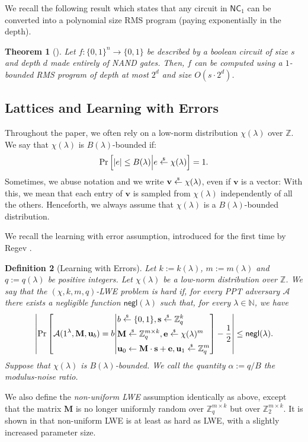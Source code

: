 \documentclass{article}
\newtheorem{theorem}{Theorem}\newtheorem{lemma}[theorem]{Lemma}\newtheorem{proposition}[theorem]{Proposition}\newtheorem{corollary}[theorem]{Corollary}\newtheorem{definition}[theorem]{Definition}\newtheorem{claim}[theorem]{Claim}
\newcommand{\getsr}{\overset{\raisebox{-1pt}{$\scriptscriptstyle \$$}}{\gets}}
\newcommand{\sample}{\getsr}
\newcommand{\N}{\mathbb{N}}
\newcommand{\Z}{\mathbb{Z}}
\newcommand{\negl}{\mathsf{negl}}
\renewcommand{\sec}{\ensuremath{\lambda}}
\newcommand{\Adv}{\mathcal{A}}
\newcommand\bbbone{1}
\begin{document}
We recall the following result which states that any circuit in $\mathsf{NC}_1$ can be converted into a polynomial size RMS program (paying exponentially in the depth).

\begin{theorem}[\cite{barrington,C:BoyGilIsh16}]
Let $f:\{0, 1\}^n\rightarrow \{0, 1\}$ be described by a boolean circuit of size $s$ and depth $d$ made entirely of NAND gates. Then, $f$ can be computed using a $1$-bounded RMS program of depth at most $2^d$ and size $O(s\cdot 2^d)$.
\end{theorem}

\subsection{Lattices and Learning with Errors}
Throughout the paper, we often rely on a low-norm distribution $\chi(\sec)$ over $\Z$. We say that $\chi(\sec)$ is $B(\sec)$-bounded if: \[\Pr\left[\lvert e\rvert\le B(\sec)\middle| e\sample\chi(\sec)\right]=1.\] Sometimes, we abuse notation and we write $\mathbf{v}\sample\chi(\sec)$, even if $\mathbf{v}$ is a vector: With this, we mean that each entry of $\mathbf{v}$ is sampled from $\chi(\sec)$ independently of all the others. {Henceforth, we always assume that $\chi(\lambda)$ is a $B(\sec)$-bounded distribution.}

We recall the learning with error assumption, introduced for the first time by Regev \cite{STOC:Regev05}.
\begin{definition}[Learning with Errors]
    Let $k:=k(\sec)$, $m:=m(\sec)$ and $q:=q(\sec)$ be positive integers. Let $\chi(\sec)$ be a low-norm distribution over $\Z$.
    We say that the $(\chi, k, m, q)$-LWE problem is hard if, for every PPT adversary $\Adv$ there exists a negligible function $\negl(\sec)$ such that, for every $\sec\in\N$, we have
    \[\left\lvert \Pr\left[\Adv(\bbbone^\sec, \mathbf{M}, \mathbf{u}_b)=b\middle| \begin{aligned}[c]
    &b\sample\{0, 1\}, \mathbf{s}\sample\Z_q^k\\
    &\mathbf{M}\sample\Z_q^{m\times k}, \mathbf{e}\sample\chi(\sec)^m\\
    &\mathbf{u}_0\gets \mathbf{M}\cdot \mathbf{s}+\mathbf{e}, \mathbf{u}_1\sample\Z_q^m\\
    \end{aligned}\right]-\frac{1}{2}
    \right\rvert\le \negl(\sec).\]
Suppose that $\chi(\sec)$ is $B(\sec)$-bounded. We call the quantity $\alpha:=q/B$ the modulus-noise ratio.
\end{definition}
%
We also define the \emph{non-uniform LWE} assumption identically as above, except that the matrix $\mathbf{M}$ is no longer uniformly random over $\Z_q^{m\times k}$ but over $\Z_2^{m\times k}$. It is shown in \cite{C:BLMR13} that non-uniform LWE is at least as hard as LWE, with a slightly increased parameter size.
\end{document}
